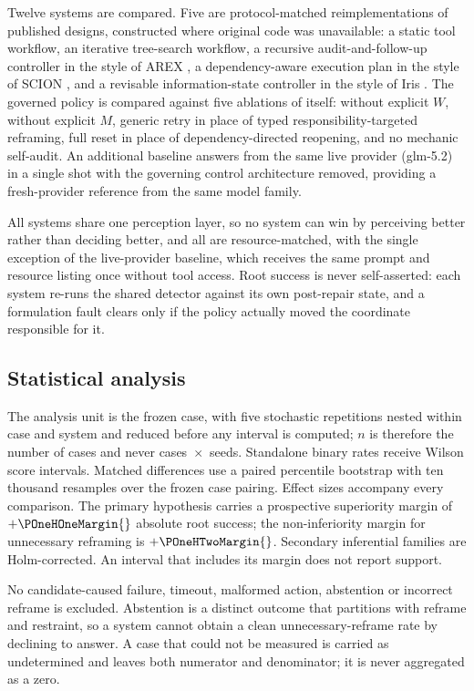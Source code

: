 Twelve systems are compared. Five are protocol-matched reimplementations of
published designs, constructed where original code was unavailable: a static
tool workflow, an iterative tree-search workflow, a recursive audit-and-follow-up
controller in the style of AREX \cite{arex2026}, a dependency-aware execution
plan in the style of SCION \cite{scion2026}, and a revisable
information-state controller in the style of Iris \cite{iris2026}. The governed
policy is compared against five ablations of itself: without explicit $W$,
without explicit $M$, generic retry in place of typed responsibility-targeted
reframing, full reset in place of dependency-directed reopening, and no mechanic
self-audit. An additional baseline answers from the same live provider
(glm-5.2) in a single shot with the governing control architecture removed,
providing a fresh-provider reference from the same model family.

All systems share one perception layer, so no system can win by perceiving
better rather than deciding better, and all are resource-matched, with the
single exception of the live-provider baseline, which receives the same prompt
and resource listing once without tool access. Root success is never
self-asserted: each system re-runs the shared detector against its own
post-repair state, and a formulation fault clears only if the policy actually
moved the coordinate responsible for it.

\subsection{Statistical analysis}

The analysis unit is the frozen case, with five stochastic repetitions nested
within case and system and reduced before any interval is computed; $n$ is
therefore the number of cases and never cases~$\times$~seeds. Standalone binary
rates receive Wilson score intervals. Matched differences use a paired
percentile bootstrap with ten thousand resamples over the frozen case pairing.
Effect sizes accompany every comparison. The primary hypothesis carries a
prospective superiority margin of $+\POneHOneMargin{}$ absolute root success;
the non-inferiority margin for unnecessary reframing is $+\POneHTwoMargin{}$.
Secondary inferential families are Holm-corrected. An interval that includes its
margin does not report support.

No candidate-caused failure, timeout, malformed action, abstention or incorrect
reframe is excluded. Abstention is a distinct outcome that partitions with
reframe and restraint, so a system cannot obtain a clean unnecessary-reframe
rate by declining to answer. A case that could not be measured is carried as
undetermined and leaves both numerator and denominator; it is never aggregated
as a zero.

